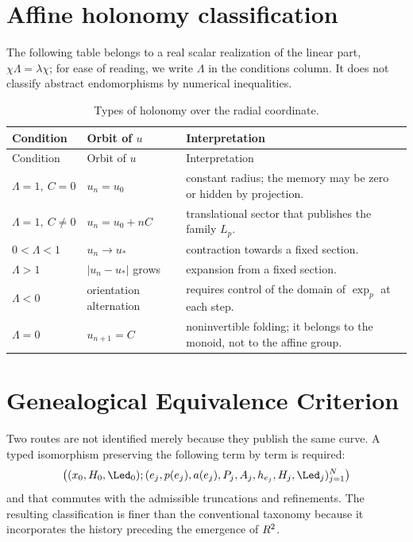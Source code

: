 \section{Affine holonomy classification}

The following table belongs to a real scalar realization of the
linear part, \(\chi\Lambda=\lambda\chi\); for ease of reading, we write
\(\Lambda\) in the conditions column. It does not classify abstract
endomorphisms by numerical inequalities.

\begin{longtable}{p{}p{}p{}}
\caption{Types of holonomy over the radial coordinate.}
\label{espiral:tab:tipos-holonomia}\\
\toprule
Condition&Orbit of \(u\)&Interpretation\\
\midrule
\endfirsthead
\toprule
Condition&Orbit of \(u\)&Interpretation\\
\midrule
\endhead
\(\Lambda=1,\ C=0\)&\(u_n=u_0\)&constant radius; the memory may be
zero or hidden by projection.\\
\(\Lambda=1,\ C\neq0\)&\(u_n=u_0+nC\)&translational sector that publishes the
family \(L_p\).\\
\(0<\Lambda<1\)&\(u_n\to u_*\)&contraction towards a fixed section.\\
\(\Lambda>1\)&\(|u_n-u_*|\) grows&expansion from a fixed section.\\
\(\Lambda<0\)&orientation alternation&requires control of the domain of
\(\exp_p\) at each step.\\
\(\Lambda=0\)&\(u_{n+1}=C\)&noninvertible folding; it belongs to the
monoid, not to the affine group.\\
\bottomrule
\end{longtable}

\section{Genealogical Equivalence Criterion}

Two routes are not identified merely because they publish the same curve. A
typed isomorphism preserving the following term by term is required:
\[
 \bigl(
 (x_0,H_0,\Led_0);
 (\widehat e_j,p(\widehat e_j),a(\widehat e_j),P_j,A_j,
 h_{e_j},H_j,\Led_j)_{j=1}^{N}
 \bigr)
\]
and that commutes with the admissible truncations and refinements. The resulting
classification is finer than the conventional taxonomy because it incorporates the
history preceding the emergence of \(R^2\).

